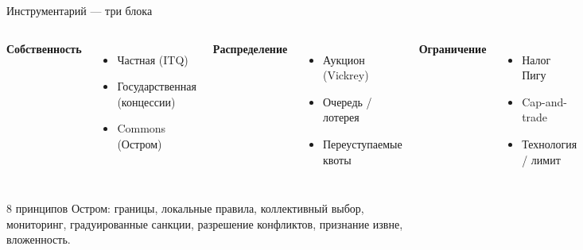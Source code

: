 \documentclass[10pt]{beamer}
\begin{document}
\begin{frame}{Инструментарий — три блока}
  \begin{columns}
    \textbf{Собственность}
    \begin{itemize}
      \item Частная (ITQ)
      \item Государственная (концессии)
      \item Commons (Остром)
    \end{itemize}

    \textbf{Распределение}
    \begin{itemize}
      \item Аукцион (Vickrey)
      \item Очередь / лотерея
      \item Переуступаемые квоты
    \end{itemize}

    \textbf{Ограничение}
    \begin{itemize}
      \item Налог Пигу
      \item Cap-and-trade
      \item Технология / лимит
    \end{itemize}
  \end{columns}
  \vspace{0.4cm}
  \footnotesize 8 принципов Остром: границы, локальные правила, коллективный выбор, мониторинг, градуированные санкции, разрешение конфликтов, признание извне, вложенность.
\end{frame}
\end{document}
